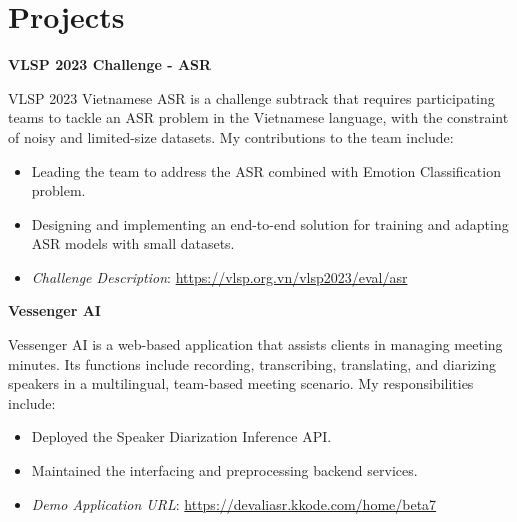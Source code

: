 \section{Projects}
\vspace{-2mm}
\begin{multicols}{1}
    \begin{flushleft}
        \textbf{VLSP 2023 Challenge - ASR}
    \end{flushleft}
\end{multicols}

\vspace{-5mm}

\indent VLSP 2023 Vietnamese ASR is a challenge subtrack that requires participating teams to tackle an ASR problem in the Vietnamese language, with the constraint of noisy and limited-size datasets. My contributions to the team include:
\vspace{-1.5mm}
\begin{itemize}[noitemsep]
    \item Leading the team to address the ASR combined with Emotion Classification problem.
    \item Designing and implementing an end-to-end solution for training and adapting ASR models with small datasets.
    \item \emph{Challenge Description}: \href{https://vlsp.org.vn/vlsp2023/eval/asr}{https://vlsp.org.vn/vlsp2023/eval/asr}
\end{itemize}

\begin{multicols}{1}
    \begin{flushleft}
        \textbf{Vessenger AI}
    \end{flushleft}
\end{multicols}

\vspace{-5mm}

\indent Vessenger AI is a web-based application that assists clients in managing meeting minutes. Its functions include recording, transcribing, translating, and diarizing speakers in a multilingual, team-based meeting scenario. My responsibilities include: 
\vspace{-1.5mm}
\begin{itemize}[noitemsep]
    \item Deployed the Speaker Diarization Inference API.
    \item Maintained the interfacing and preprocessing backend services.
    \item \emph{Demo Application URL}: \href{https://devaliasr.kkode.com/home/beta7}{https://devaliasr.kkode.com/home/beta7}
\end{itemize}

